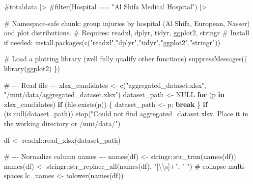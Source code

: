 \documentclass[
  letterpaper,
  DIV=11,
  numbers=noendperiod]{scrartcl}
\newenvironment{Shaded}{\begin{snugshade}}{\end{snugshade}}
\newcommand{\CommentTok}[1]{\textcolor[rgb]{0.37,0.37,0.37}{#1}}
\newcommand{\ConstantTok}[1]{\textcolor[rgb]{0.56,0.35,0.01}{#1}}
\newcommand{\ControlFlowTok}[1]{\textcolor[rgb]{0.00,0.23,0.31}{\textbf{#1}}}
\newcommand{\FunctionTok}[1]{\textcolor[rgb]{0.28,0.35,0.67}{#1}}
\newcommand{\NormalTok}[1]{\textcolor[rgb]{0.00,0.23,0.31}{#1}}
\newcommand{\OtherTok}[1]{\textcolor[rgb]{0.00,0.23,0.31}{#1}}
\newcommand{\SpecialCharTok}[1]{\textcolor[rgb]{0.37,0.37,0.37}{#1}}
\newcommand{\StringTok}[1]{\textcolor[rgb]{0.13,0.47,0.30}{#1}}
\begin{document}
\begin{Shaded}
\begin{Highlighting}[]
\CommentTok{\#totaldata |\textgreater{}}
  \CommentTok{\#filter(\textasciigrave{}Hospital\textasciigrave{} == "Al Shifa Medical Hospital") |\textgreater{}}
  
  
\CommentTok{\# Namespace{-}safe chunk: group injuries by hospital (Al Shifa, European, Nasser) and plot distributions.}
\CommentTok{\# Requires: readxl, dplyr, tidyr, ggplot2, stringr}
\CommentTok{\# Install if needed: install.packages(c("readxl","dplyr","tidyr","ggplot2","stringr"))}

\CommentTok{\# Load a plotting library (we\textquotesingle{}ll fully qualify other functions)}
\FunctionTok{suppressMessages}\NormalTok{(\{ }\FunctionTok{library}\NormalTok{(ggplot2) \})}

\CommentTok{\# {-}{-}{-} Read file {-}{-}{-}}
\NormalTok{xlsx\_candidates }\OtherTok{\textless{}{-}} \FunctionTok{c}\NormalTok{(}\StringTok{"aggregated\_dataset.xlsx"}\NormalTok{, }\StringTok{"/mnt/data/aggregated\_dataset.xlsx"}\NormalTok{)}
\NormalTok{dataset\_path }\OtherTok{\textless{}{-}} \ConstantTok{NULL}
\ControlFlowTok{for}\NormalTok{ (p }\ControlFlowTok{in}\NormalTok{ xlsx\_candidates) }\ControlFlowTok{if}\NormalTok{ (}\FunctionTok{file.exists}\NormalTok{(p)) \{ dataset\_path }\OtherTok{\textless{}{-}}\NormalTok{ p; }\ControlFlowTok{break}\NormalTok{ \}}
\ControlFlowTok{if}\NormalTok{ (}\FunctionTok{is.null}\NormalTok{(dataset\_path)) }\FunctionTok{stop}\NormalTok{(}\StringTok{"Could not find aggregated\_dataset.xlsx. Place it in the working directory or /mnt/data/"}\NormalTok{)}

\NormalTok{df }\OtherTok{\textless{}{-}}\NormalTok{ readxl}\SpecialCharTok{::}\FunctionTok{read\_xlsx}\NormalTok{(dataset\_path)}

\CommentTok{\# {-}{-}{-} Normalize column names {-}{-}{-}}
\FunctionTok{names}\NormalTok{(df) }\OtherTok{\textless{}{-}}\NormalTok{ stringr}\SpecialCharTok{::}\FunctionTok{str\_trim}\NormalTok{(}\FunctionTok{names}\NormalTok{(df))}
\FunctionTok{names}\NormalTok{(df) }\OtherTok{\textless{}{-}}\NormalTok{ stringr}\SpecialCharTok{::}\FunctionTok{str\_replace\_all}\NormalTok{(}\FunctionTok{names}\NormalTok{(df), }\StringTok{"[}\SpecialCharTok{\textbackslash{}\textbackslash{}}\StringTok{s]+"}\NormalTok{, }\StringTok{" "}\NormalTok{)  }\CommentTok{\# collapse multi{-}spaces}
\NormalTok{lc\_names }\OtherTok{\textless{}{-}} \FunctionTok{tolower}\NormalTok{(}\FunctionTok{names}\NormalTok{(df))}


\end{Highlighting}
\end{Shaded}
\end{document}
